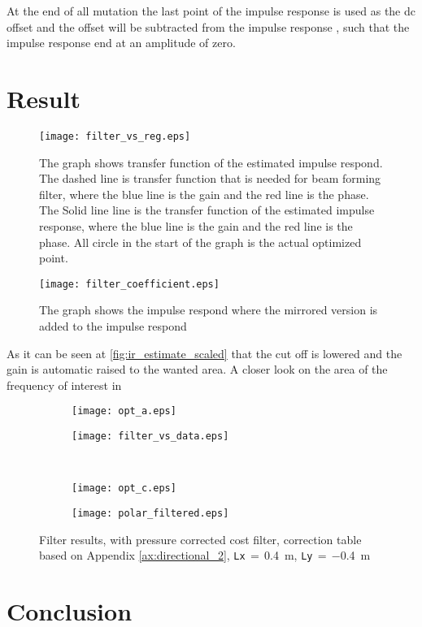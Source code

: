 At the end of all mutation the last point of the impulse response is used as the \gls{dc} offset and the offset will be subtracted from the impulse response , such that the impulse response end at an amplitude of zero. 

\section{Result}


 

\begin{figure}[H]
	\centering
	\texttt{[image: filter\_vs\_reg.eps]}
	\caption{The graph shows transfer function of the estimated impulse respond. The dashed line is transfer function that is needed for beam forming filter, where the blue line is the gain and the red line is the phase. The Solid line line is the transfer function of the estimated impulse response, where the blue line is the gain and the red line is the phase. All circle in the start of the graph is the actual optimized point.}
		\label{fig:filter_vs_reg}
\end{figure}

\begin{figure}[H]
	\centering
	\texttt{[image: filter\_coefficient.eps]}
	\caption{The graph shows the impulse respond where the mirrored version is added to the impulse respond}
		\label{fig:filter_coefficient}
\end{figure}

As it can be seen at \autoref{fig:ir_estimate_scaled} that the cut off is lowered and the gain is automatic raised to the wanted area. A closer look on the area of the frequency of interest in 


\begin{figure}[H]
\begin{subfigure}[c]{0.5\textwidth}
\texttt{[image: opt\_a.eps]}
\label{fig:opt_res_a}
\end{subfigure}
\begin{subfigure}[c]{0.5\textwidth}
\texttt{[image: filter\_vs\_data.eps]}
\label{fig:filter_vs_data}
\end{subfigure}\\
\hspace{0.1\textheight}
\begin{subfigure}[c]{0.5\textwidth}
\texttt{[image: opt\_c.eps]}
\label{fig:opt_res_c}
\end{subfigure}
\begin{subfigure}[c]{0.5\textwidth}
\texttt{[image: polar\_filtered.eps]}
\label{fig:polar_filtered}
\end{subfigure}
\caption{Filter results, with pressure corrected cost filter, correction table based on Appendix \ref{ax:directional_2}, \textcolor{green3}{\texttt{Lx}}\,$=$\,\SI{0.4}{\meter}, \textcolor{green3}{\texttt{Ly}}\,$=\,$\SI{-0.4}{\meter}}
		\label{fig:opt_res}
\end{figure}


\section{Conclusion}